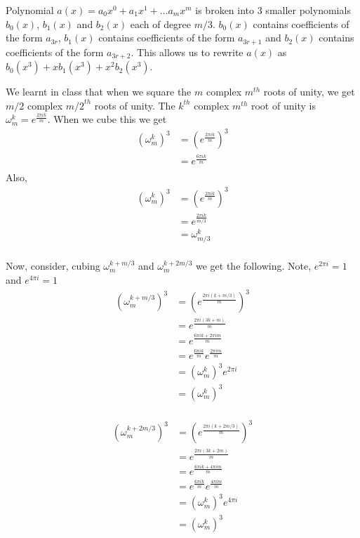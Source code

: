 \documentclass{article}
\begin{document}
    Polynomial $a(x) = a_0x^0 + a_1x^1 + \dots a_mx^m$ is broken into 3 smaller polynomials $b_0(x)$, $b_1(x)$ and $b_2(x)$ each of degree $m/3$. $b_0(x)$ contains coefficients of the form $a_{3r}$, $b_1(x)$ contains coefficients of the form $a_{3r+1}$ and $b_2(x)$ contains coefficients of the form $a_{3r+2}$. This allows us to rewrite $a(x)$ as $b_0(x^3) + xb_1(x^3) + x^2b_2(x^3)$.

    We learnt in class that when we square the $m$ complex $m^{th}$ roots of unity, we get $m/2$ complex ${m/2}^{th}$ roots of unity. The $k^{th}$ complex $m^{th}$ root of unity is $\omega_m^k = e^{\frac{2\pi ik}{m}}$. When we cube this we get
    \begin{align*}
        (\omega_m^k)^3  & = (e^{\frac{2\pi ik}{m}})^3 \\
                        & = e^{\frac{6\pi ik}{m}} \\
    \end{align*}
    Also,
    \begin{align*}
        (\omega_m^k)^3  & = (e^{\frac{2\pi ik}{m}})^3 \\
                        & = e^{\frac{2\pi ik}{m/3}} \\
                        & = \omega_{m/3}^k \\
    \end{align*}

    Now, consider, cubing $\omega_m^{k+m/3}$ and $\omega_m^{k+2m/3}$ we get the following. Note, $e^{2\pi i} = 1$ and $e^{4\pi i} = 1$
    \begin{align*}
        (\omega_m^{k+m/3})^3    & = (e^{\frac{2\pi i(k+m/3)}{m}})^3 \\
                                & = e^{\frac{2\pi i(3k+m)}{m}} \\
                                & = e^{\frac{6\pi ik + 2\pi im}{m}} \\
                                & = e^{\frac{6\pi ik}{m}} e^{\frac{2\pi im}{m}} \\
                                & = (\omega_m^k)^3 e^{2\pi i} \\
                                & = (\omega_m^k)^3 \\
    \end{align*}

    \begin{align*}
        (\omega_m^{k+2m/3})^3   & = (e^{\frac{2\pi i(k+2m/3)}{m}})^3 \\
                                & = e^{\frac{2\pi i(3k+2m)}{m}} \\
                                & = e^{\frac{6\pi ik + 4\pi im}{m}} \\
                                & = e^{\frac{6\pi ik}{m}} e^{\frac{4\pi im}{m}} \\
                                & = (\omega_m^k)^3 e^{4\pi i} \\
                                & = (\omega_m^k)^3 \\
    \end{align*}
\end{document}
